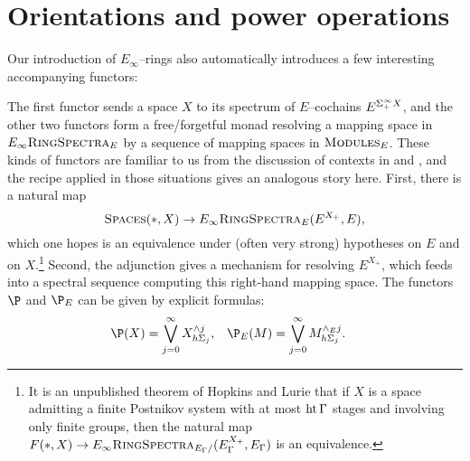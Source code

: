 










\section{Orientations and power operations}\label{PowerOpnsSection}

Our introduction of \(E_\infty\)--rings also automatically introduces a few interesting accompanying functors:
\begin{center}
\end{center}
The first functor sends a space \(X\) to its spectrum of \(E\)--cochains \(E^{\Sigma^\infty_+ X}\), and the other two functors form a free/forgetful monad resolving a mapping space in \(E_\infty\normalfont\textsc{RingSpectra}_E\) by a sequence of mapping spaces in \(\normalfont\textsc{Modules}_E\).  These kinds of functors are familiar to us from the discussion of contexts in  and , and the recipe applied in those situations gives an analogous story here.  First, there is a natural map \[\normalfont\textsc{Spaces}(*, X) \to E_\infty\normalfont\textsc{RingSpectra}_E(E^{X_+}, E),\] which one hopes is an equivalence under (often very strong) hypotheses on \(E\) and on \(X\).\footnote{It is an unpublished theorem of Hopkins and Lurie that if \(X\) is a space admitting a finite Postnikov system with at most \(\operatorname{ht} \Gamma\) stages and involving only finite groups, then the natural map \(F(*, X) \to E_\infty\normalfont\textsc{RingSpectra}_{E_\Gamma/}(E_\Gamma^{X_+}, E_\Gamma)\) is an equivalence.}  Second, the adjunction gives a mechanism for resolving \(E^{X_+}\), which feeds into a spectral sequence computing this right-hand mapping space.  The functors \(\P\) and \(\P_E\) can be given by explicit formulas:
\begin{align*}
\P(X) & = \bigvee_{j=0}^\infty X^{\sm j}_{h\Sigma_j}, &
\P_E(M) & = \bigvee_{j=0}^\infty M^{\sm_E j}_{h\Sigma_j}.
\end{align*}
